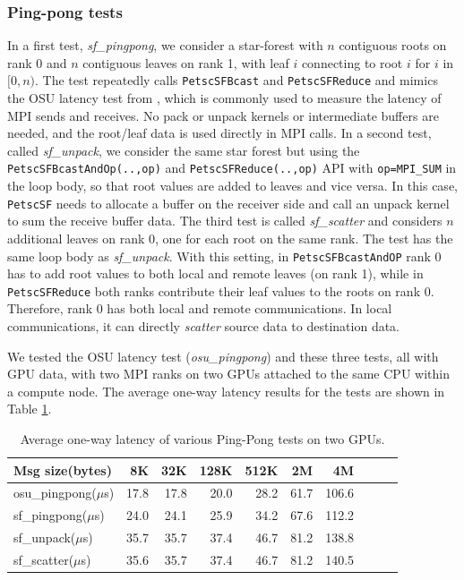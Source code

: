 \documentclass[10pt,journal,compsoc]{IEEEtran}
\begin{document}
\subsubsection{Ping-pong tests}
In a first test, \textit{sf\_pingpong}, we consider a star-forest with
$n$ contiguous roots on rank 0 and $n$ contiguous leaves on rank 1, with leaf $i$
connecting to root $i$ for $ i $ in $[0,n)$. 
The test repeatedly calls \texttt{PetscSFBcast} and
\texttt{PetscSFReduce}
and mimics the OSU latency test from \cite{OSUMicro}, which is commonly used to measure the latency of MPI sends and receives.
No pack or unpack kernels or intermediate buffers are needed, and the root/leaf data is used directly in MPI calls. %
In a second test, called \textit{sf\_unpack}, we consider the same star forest but using the \texttt{PetscSFBcastAndOp(..,op)} and
\texttt{PetscSFReduce(..,op)} API with \texttt{op=MPI\_SUM} in the loop
body, so that root values are added to leaves and vice versa. In this case,
{\tt PetscSF} needs to allocate a buffer on the receiver side and call an unpack kernel to
sum the receive buffer data. The third test is called
\textit{sf\_scatter} and considers $n$ additional leaves on rank 0, one for each root on the same rank.
The test has the same loop body as \textit{sf\_unpack}. With this setting, in
\texttt{PetscSFBcastAndOP} rank 0 has to add root values to both local
and remote leaves (on rank 1), while in \texttt{PetscSFReduce} both ranks contribute their leaf values to the roots on rank 0.
Therefore, rank 0 has both local and remote communications. In local communications, it can
directly 
\textit{scatter} 
source data to destination data.

We tested the OSU latency test (\textit{osu\_pingpong}) and these three tests, all with GPU data, with two MPI ranks on two GPUs attached to the same CPU within
a compute node. The
average one-way latency results for the tests are shown in Table
\ref{tab:pingpong}. 
\begin{table}[ht]
\small
\setlength\tabcolsep{5.5pt}
\caption{Average one-way latency of various Ping-Pong tests on two GPUs.}
\begin{tabular}{|l|r|r|r|r|r|r|r|r|r|}
\hline
Msg size(bytes)        & 8K   & 32K   & 128K   & 512K   & 2M      & 4M      \\ \hline
osu\_pingpong($\mu$s)  & 17.8 & 17.8  & 20.0   & 28.2   & 61.7    & 106.6   \\ \hline
sf\_pingpong($\mu$s)   & 24.0 & 24.1  & 25.9   & 34.2   & 67.6    & 112.2   \\ \hline
sf\_unpack($\mu$s)    & 35.7 & 35.7  & 37.4   & 46.7   & 81.2    & 138.8   \\ \hline
sf\_scatter($\mu$s)   & 35.6 & 35.7  & 37.4   & 46.7   & 81.2    & 140.5   \\ \hline
\end{tabular}
\label{tab:pingpong}
\end{table}
\end{document}
